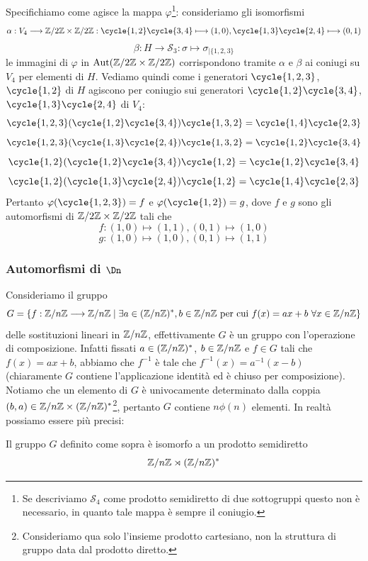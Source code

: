 \documentclass[11pt]{scrartcl}
\begin{document}
	Specifichiamo come agisce la mappa $\varphi$\footnote{Se descriviamo $\mathcal{S}_4$ 
		come prodotto semidiretto di due sottogruppi questo non è 
		necessario, in quanto tale mappa è sempre il coniugio.
	}:
	consideriamo gli isomorfismi
	\[
	\alpha: V_4\longrightarrow \Z2\times\Z2: \cycle{1, 2}\cycle{3, 4}\longmapsto (1, 0),
	\cycle{1, 3}\cycle{2, 4} \longmapsto (0, 1)
	\]
	\[
	\beta: H \longrightarrow \mathcal{S}_3: \sigma \longmapsto \sigma_{\mid\{1, 2, 3\}}
	\]
	le immagini di $\varphi$ in $\operatorname{Aut}(\mathbb{Z}/{2}\mathbb{Z}\times\mathbb{Z}/{2}\mathbb{Z})$ corrispondono tramite $\alpha$
	e $\beta$ ai coniugi su $V_4$ per elementi di $H$. Vediamo quindi come
	i generatori $\cycle{1, 2, 3}$, $\cycle{1, 2}$ di $H$ agiscono per coniugio
	sui generatori $\cycle{1, 2}\cycle{3, 4}$, $\cycle{1, 3}\cycle{2, 4}$ di $V_4$:
	\[
	\cycle{1, 2, 3}(\cycle{1, 2}\cycle{3, 4})\cycle{1, 3, 2} = \cycle{1, 4}\cycle{2, 3}
	\]
	\[
	\cycle{1, 2, 3}(\cycle{1, 3}\cycle{2, 4})\cycle{1, 3, 2} = \cycle{1, 2}\cycle{3, 4}
	\]
	\[
	\cycle{1, 2}(\cycle{1, 2}\cycle{3, 4})\cycle{1, 2} = \cycle{1, 2}\cycle{3, 4}
	\]
	\[
	\cycle{1, 2}(\cycle{1, 3}\cycle{2, 4})\cycle{1, 2} = \cycle{1, 4}\cycle{2, 3}
	\]
	Pertanto $\varphi(\cycle{1, 2, 3}) = f$ e $\varphi(\cycle{1, 2}) = g$,
	dove $f$ e $g$ sono gli automorfismi di $\mathbb{Z}/{2}\mathbb{Z}\times\mathbb{Z}/{2}\mathbb{Z}$ tali che
	\[
	f: (1, 0)\longmapsto (1, 1), (0, 1) \longmapsto (1, 0)
	\]
	\[
	g: (1, 0)\longmapsto (1, 0), (0, 1) \longmapsto (1, 1)
	\]
	
	\subsubsection{Automorfismi di \texorpdfstring{$\Dn$}{Dₙ}}
	
	Consideriamo il gruppo 
	\[
	G = \{f: {\mathbb Z}/n{\mathbb Z}\longrightarrow{\mathbb Z}/n{\mathbb Z}\mid \exists a \in ({\mathbb Z}/n{\mathbb Z})^*, b \in {\mathbb Z}/n{\mathbb Z}\text{ per cui }
	f(x) = ax + b~\forall x \in {\mathbb Z}/n{\mathbb Z}\}
	\]
	delle sostituzioni lineari in ${\mathbb Z}/n{\mathbb Z}$, effettivamente $G$ è un gruppo con 
	l'operazione di composizione. Infatti fissati $a \in ({\mathbb Z}/n{\mathbb Z})^*$, $b \in {\mathbb Z}/n{\mathbb Z}$ e
	$f \in G$ tali che $f(x) = ax + b$, abbiamo che $f^{-1}$ è tale che 
	$f^{-1}(x) = a^{-1}(x - b)$ (chiaramente $G$ contiene l'applicazione identità 
	ed è chiuso per composizione). Notiamo che un elemento di $G$ è univocamente
	determinato dalla coppia $(b, a) \in {\mathbb Z}/n{\mathbb Z} \times ({\mathbb Z}/n{\mathbb Z})^*$\footnote{
		Consideriamo qua solo l'insieme prodotto cartesiano, non la struttura di 
		gruppo data dal prodotto diretto.
	}, pertanto $G$
	contiene $n\phi(n)$ elementi. In realtà possiamo essere più precisi:
	
	\begin{proposition}
		Il gruppo $G$ definito come sopra è isomorfo a un prodotto semidiretto 
		\[
		{\mathbb Z}/n{\mathbb Z} \rtimes ({\mathbb Z}/n{\mathbb Z})^*
		\]
	\end{proposition}
	
\end{document}
